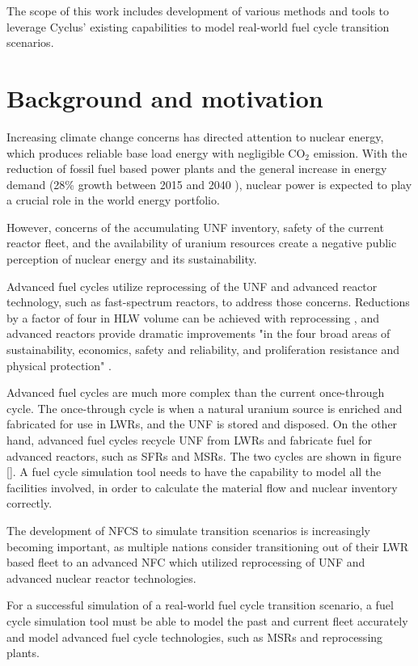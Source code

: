 The scope of this work includes development of
various methods and tools to leverage Cyclus' existing
capabilities to model real-world fuel cycle transition scenarios.

\section{Background and motivation}
Increasing climate change concerns has directed attention
to nuclear energy, which produces reliable base load energy
with negligible CO$_2$ emission. With the reduction of fossil
fuel based power plants and the general increase in energy demand
(28\% growth between 2015 and 2040 \cite{conti_international_2016}),
nuclear power is expected to play a crucial role in the world energy portfolio.

However, concerns of the accumulating \gls{UNF} inventory,
safety of the current reactor fleet, and the availability of
uranium resources create a negative public perception of
nuclear energy and its sustainability.

Advanced fuel cycles utilize reprocessing of the \gls{UNF}
and advanced reactor technology, such as fast-spectrum reactors,
to address those concerns. Reductions by a factor of four
in \gls{HLW} volume can be achieved with reprocessing \cite{widder_benefits_2010},
and advanced reactors provide dramatic improvements "in the four
broad areas of sustainability, economics, safety and reliability,
and proliferation resistance and physical protection" \cite{committee_technology_2002}.

Advanced fuel cycles are much more complex than
the current once-through cycle. The once-through cycle is when a natural uranium source is
enriched and fabricated for use in \glspl{LWR}, and the \gls{UNF} is stored and disposed.
On the other hand, advanced fuel cycles recycle \gls{UNF} from \glspl{LWR} and
fabricate fuel for advanced reactors, such as \glspl{SFR} and \glspl{MSR}. 
The two cycles are shown in figure []. A fuel cycle simulation tool needs
to have the capability to model all the facilities involved, in order to
calculate the material flow and nuclear inventory correctly.

The development of \gls{NFCS}
to simulate transition scenarios
is increasingly becoming important, as multiple nations
consider transitioning out of their \gls{LWR} based fleet
to an advanced \gls{NFC} which utilized reprocessing
of \gls{UNF} and advanced nuclear reactor technologies.

For a successful simulation of a real-world fuel cycle transition
scenario, a fuel cycle simulation tool must be able to 
model the past and current fleet accurately and model advanced
fuel cycle technologies, such as \glspl{MSR} and reprocessing plants.

